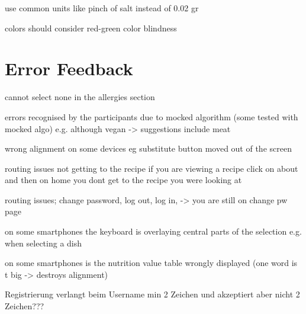 use common units like pinch of salt instead of 0.02 gr
        
        colors should consider red-green color blindness

\section{Error Feedback}


cannot select none in the allergies section

errors recognised by the participants due to mocked algorithm (some tested with mocked algo) e.g. although vegan -> suggestions include meat

wrong alignment on some devices eg substitute button moved out of the screen


routing issues not getting to the recipe if you are viewing a recipe click on about and then on home you dont get to the recipe you were looking at

routing issues; change password, log out, log in, -> you are still on change pw page

on some smartphones the keyboard is overlaying central parts of the selection e.g. when selecting a dish

on some smartphones is the nutrition value table wrongly displayed (one word is t big -> destroys alignment)

Registrierung verlangt beim Username min 2 Zeichen und akzeptiert aber nicht 2 Zeichen??? 



